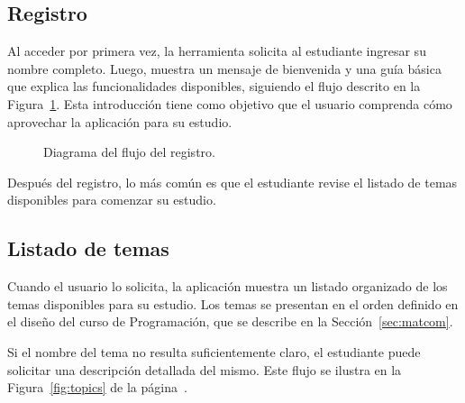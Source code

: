 \subsection{Registro}

Al acceder por primera vez, la herramienta solicita al estudiante ingresar su nombre completo. Luego, muestra un mensaje de bienvenida y una guía básica que explica las funcionalidades disponibles, siguiendo el flujo descrito en la Figura~\ref{fig:register}. Esta introducción tiene como objetivo que el usuario comprenda cómo aprovechar la aplicación para su estudio.

\begin{figure}[h!]
  \centering
  \caption{Diagrama del flujo del registro.}\label{fig:register}
\end{figure}

Después del registro, lo más común es que el estudiante revise el listado de temas disponibles para comenzar su estudio.

\subsection{Listado de temas}

Cuando el usuario lo solicita, la aplicación muestra un listado organizado de los temas disponibles para su estudio. Los temas se presentan en el orden definido en el diseño del curso de Programación, que se describe en la Sección~\ref{sec:matcom}.

Si el nombre del tema no resulta suficientemente claro, el estudiante puede solicitar una descripción detallada del mismo. Este flujo se ilustra en la Figura~\ref{fig:topics} de la página~\pageref{fig:topics}.

